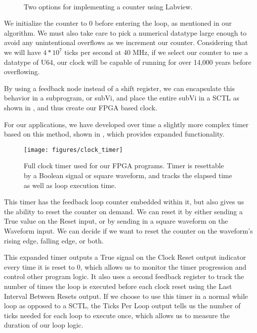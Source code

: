 \begin{figure}[!ht]
  \centering
   \\
  \caption[Labview Counter Implementations]{ Two options for implementing a counter using Labview.}
  \label{fig:counter_lv}
\end{figure}


We initialize the counter to 0 before entering the loop, as mentioned in our
algorithm.  We must also take care to pick a numerical datatype large enough
to avoid any unintentional overflows as we increment our counter.  Considering
that we will have $4*10^7$ ticks per second at 40 MHz, if we select our
counter to use a datatype of U64, our clock will be capable of running for over 14,000 years before overflowing.

By using a feedback node instead of a shift register, we can encapsulate this
behavior in a subprogram, or subVi, and place the entire subVi in a SCTL as
shown in , and thus create our FPGA based clock.

For our applications, we have developed over time a slightly more complex
timer based on this method, shown in , which provides expanded functionality.

\begin{figure}[!ht] 
 \centering 
 \texttt{[image: figures/clock\_timer]} 
 \caption[Clock Timer]{Full clock timer used for our FPGA programs.  Timer is resettable by a Boolean signal or square waveform, and tracks the elapsed time as well as loop execution time.} 
 \label{fig:clock_timer} 
\end{figure}

This timer has the feedback loop counter embedded within it, but also gives us
the ability to reset the counter on demand.  We can reset it by either sending
a True value on the Reset input, or by sending in a square waveform on the
Waveform input.  We can decide if we want to reset the counter on the waveform's rising edge, falling edge, or both.

This expanded timer outputs a True signal on the Clock Reset output indicator
every time it is reset to 0, which allows us to monitor the timer progression
and control other program logic.  It also uses a second feedback register to
track the number of times the loop is executed before each clock reset using
the Last Interval Between Resets output.
If we choose to use this timer in a normal while loop as opposed to a SCTL, the Ticks Per Loop output tells us the number of ticks needed for each loop to execute once, which allows us to measure the duration of our loop logic.




